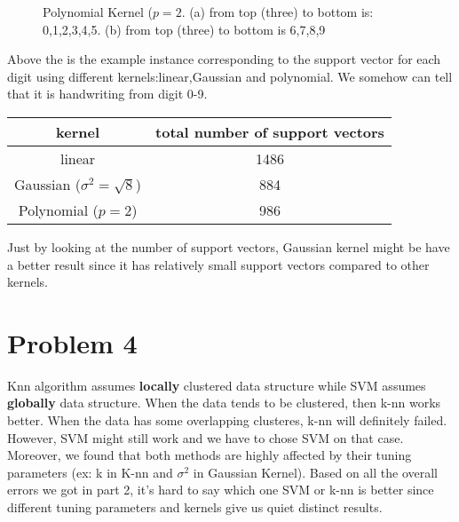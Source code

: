 \documentclass{article}
\begin{document}
   \begin{figure}[H]
   	\centering
   	
   	\caption{Polynomial Kernel ($p=2$. (a) from top (three) to bottom is: 0,1,2,3,4,5. (b) from top (three) to bottom is 6,7,8,9 }
   	\label{fig:pattern1}
   \end{figure}
   
   
 
 

 Above the is the example instance corresponding to the support vector for each digit using different kernels:linear,Gaussian and polynomial. We somehow can tell that it is handwriting from digit 0-9. 
 
\begin{table}[H]
	\centering
	\begin{tabular}{|c|c|}
		\hline
		kernel&total number of support vectors\\
		\hline
		linear &1486\\
		\hline 
		Gaussian ($\sigma^2=\sqrt{8}$) & 884\\
		\hline
	Polynomial ($p=2$) & 986\\
	\hline
	\end{tabular}
\end{table}
Just by looking at the number of support vectors, Gaussian kernel might be have a better result since it has relatively small support vectors compared to other kernels.
\section{Problem 4}


Knn algorithm assumes\textbf{ locally} clustered data structure while SVM assumes \textbf{globally} data structure. When the data tends to be clustered, then k-nn works better. When the data has some overlapping clusteres, k-nn will definitely failed. However, SVM might still work and we have to chose SVM on that case.\\

Moreover, we found that both methods are highly affected by their tuning parameters (ex: k in K-nn and $\sigma^2$ in Gaussian Kernel). Based on all the overall errors we got in part 2, it's hard to say which one SVM or k-nn is better since different tuning parameters and kernels give us quiet distinct results. 
\end{document}
